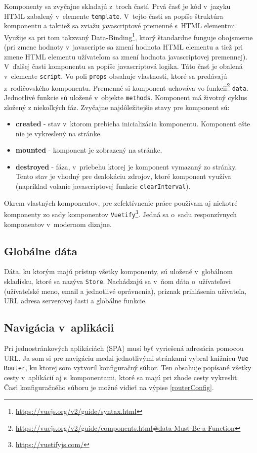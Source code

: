 \documentclass[slovak]{fitthesis}
\begin{document}
Komponenty sa zvyčajne skladajú z~troch častí. Prvá časť je kód v~jazyku HTML zabalený v~elemente \texttt{template}. V~tejto časti sa popíše štruktúra komponentu a taktiež sa zviažu javascriptové premenné s~HTML elementmi. Využije sa pri tom takzvaný Data-Binding\footnote{\url{https://vuejs.org/v2/guide/syntax.html}}, ktorý štandardne funguje obojsmerne (pri zmene hodnoty v~javascripte sa zmení hodnota HTML elementu a tiež pri zmene HTML elementu užívateľom sa zmení hodnota javascriptovej premennej). V~ďalšej časti komponentu sa popíše javascriptová logika. Táto časť je obalená v~elemente \texttt{script}. Vo poli \texttt{props} obsahuje vlastnosti, ktoré sa predávajú z~rodičovského komponentu. Premenné si komponent uchováva vo funkcii\footnote{\url{https://vuejs.org/v2/guide/components.html\#data-Must-Be-a-Function}} \texttt{data}. Jednotlivé funkcie sú uložené v~objekte \texttt{methods}. Komponent má životný cyklus zložený z niekoľkých fáz. Zvyčajne najdôležitejšie stavy pre komponent sú:
\begin{itemize}
    \item \textbf{created} - stav v~ktorom prebieha inicializácia komponentu. Komponent ešte nie je vykreslený na stránke.
    \item \textbf{mounted} - komponent je zobrazený na stránke.
    \item \textbf{destroyed} - fáza, v~priebehu ktorej je komponent vymazaný zo stránky. Tento stav je vhodný pre dealokáciu zdrojov, ktoré komponent využíva (napríklad volanie javascriptovej funkcie \texttt{clearInterval}).
\end{itemize}


Okrem vlastných komponentov, pre zefektívnenie práce používam aj niekotré komponenty zo sady komponentov \texttt{Vuetify}\footnote{\url{https://vuetifyjs.com/}}. Jedná sa o~sadu responzívnych komponentov v~modernom dizajne.

\subsection{Globálne dáta}
Dáta, ku ktorým majú prístup všetky komponenty, sú uložené v~globálnom skladisku, ktoré sa nazýva \texttt{Store}. Nachádzajú sa v~ňom dáta o~užívateľovi (užívateľské meno, email a jednotlivé oprávnenia), príznak prihlásenia užívateľa, URL adresa serverovej časti a globálne funkcie.

\subsection{Navigácia v~aplikácii}
Pri jednostránkových aplikáciách (SPA) musí byť vyriešená adresácia pomocou URL. Ja som si pre navigáciu medzi jednotlivými stránkami vybral knižnicu \texttt{Vue Router}, ku ktorej som vytvoril konfiguračný súbor. Ten obsahuje popísané všetky cesty v~aplikácií aj s~komponentami, ktoré sa majú pri zhode cesty vykresliť. Časť konfiguračného súboru je možné vidieť na výpise \ref{routerConfig}.
\end{document}
